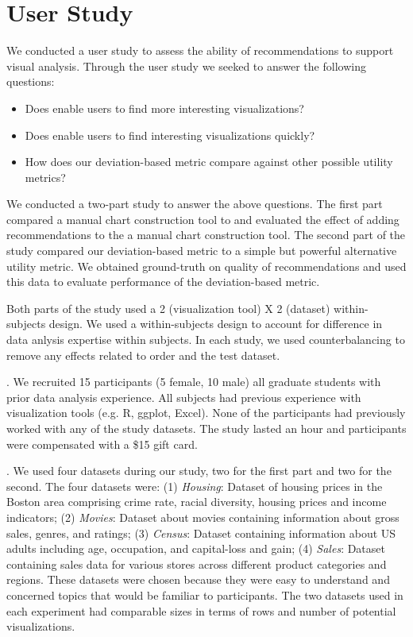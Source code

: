 
\section{User Study}
\label{sec:user_study}

We conducted a user study to assess the ability of \SeeDB recommendations
to support visual analysis.
Through the user study we seeked to answer the following questions:
\begin{itemize}
\item Does \SeeDB enable users to find more interesting visualizations?
\item Does \SeeDB enable users to find interesting visualizations quickly?
\item How does our deviation-based metric compare against other possible
utility metrics?
\end{itemize}

We conducted a two-part study to answer the above questions. 
The first part compared a manual chart construction tool to \SeeDB and 
evaluated the effect of adding recommendations to the a manual 
chart construction tool.
The second part of the study compared our deviation-based metric to a 
simple but powerful alternative utility metric.
We obtained ground-truth on quality of recommendations and used this data
to evaluate performance of the deviation-based metric.

Both parts of the study used a 2 (visualization tool) X 2 (dataset) 
within-subjects design.
We used a within-subjects design to account for difference in data anlysis
expertise within subjects.
In each study, we used counterbalancing to remove any effects related to
order and the test dataset.

 . We recruited 15 participants (5 female, 10
 male) all graduate students with prior data analysis experience.
 All subjects had previous experience with visualization tools (e.g.
 R, ggplot, Excel).
 None of the participants had previously worked with any of the study datasets.
 The study lasted an hour and participants were compensated with a \$15
 gift card.

 . We used four datasets during our study, two for the
 first part and two for the second.
 The four datasets  were: (1) {\em Housing}: Dataset of housing prices in
 the Boston area comprising crime rate, racial diversity, housing prices and
 income indicators; 
 (2) {\em Movies}: Dataset about movies containing information about gross
 sales, genres, and ratings;
 (3) {\em Census}: Dataset containing information about US adults including
 age, occupation, and capital-loss and gain;
 (4) {\em Sales}: Dataset containing sales data for various stores across
 different product categories and regions.
 These datasets were chosen because they were easy to understand and 
 concerned topics that would be familiar to participants. 
 The two datasets used in each experiment had comparable sizes in terms of
 rows and number of potential visualizations.

